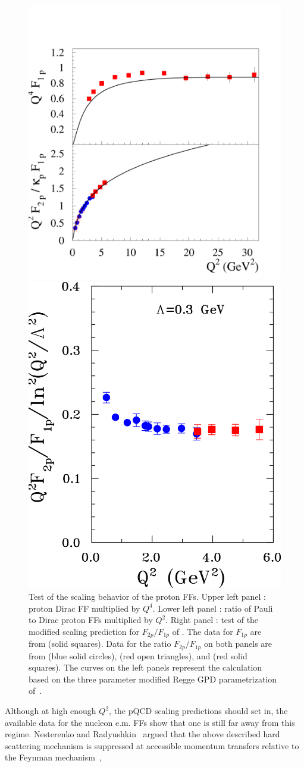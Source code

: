 \begin{figure}[h]
\centerline{  \includegraphics[height = 6 cm ]{f1f2p.pdf}  }

\centerline{  \includegraphics[height = 6 cm]{q2f2f1_belitsky_mod_col.pdf}  }

\caption{\small Test of the scaling behavior of the proton FFs.  
Upper left panel : proton Dirac FF multiplied by $Q^4$.   
Lower left panel : ratio of Pauli to Dirac proton FFs 
multiplied by $Q^2$. 
Right panel : test of the modified scaling prediction for 
$F_{2p}/F_{1p}$ of \cite{Belitsky:2002kj}. 
The data for $F_{1 p}$ are from \cite{sill} (solid squares).  
Data for the ratio $F_{2 p} / F_{1 p}$ on both panels are 
from \cite{punjabi05} (blue solid circles), 
\cite{gayou1} (red open triangles), 
and \cite{gayou2} (red solid squares). 
The curves on the left panels represent the calculation based on the  
three parameter modified Regge GPD parametrization of~\cite{guidal}.}
\label{fig:scaling}
\end{figure}
\newline
\indent
Although at high enough $Q^2$, the pQCD scaling predictions should set in, 
the available data for the nucleon e.m.  
FFs show that one is still far away from this regime. 
Nesterenko and Radyushkin~\cite{Nesterenko:1983ef} argued that the 
above described hard scattering mechanism is suppressed at accessible 
momentum transfers relative to the Feynman mechanism~\cite{feynman}, 
